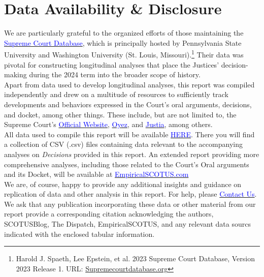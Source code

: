 \newpage

\section{Data Availability \& Disclosure}

\noindent We are particularly grateful to the organized efforts of those maintaining the \href{http://scdb.wustl.edu/}{\textcolor{blue}{Supreme Court Database}}, which is principally hosted by Pennsylvania State University and Washington University (St. Louis, Missouri).\footnote{Harold J. Spaeth, Lee Epstein, et al. 2023 Supreme Court Database, Version 2023 Release 1. URL: \href{http://Supremecourtdatabase.org}{Supremecourtdatabase.org}}  Their data was pivotal for constructing longitudinal analyses that place the Justices' decision-making during the 2024 term into the broader scope of history. \\

\noindent Apart from data used to develop longitudinal analyses, this report was compiled independently and drew on a multitude of resources to sufficiently track developments and behaviors expressed in the Court's oral arguments, decisions, and docket, among other things. These include, but are not limited to, the Supreme Court's \href{https://www.supremecourt.gov/}{\textcolor{blue}{Official Website}}, \href{https://www.oyez.org/}{\textcolor{blue}{Oyez}}, and \href{https://www.justia.com/}{\textcolor{blue}{Justia}}, among others. \\

\noindent All data used to compile this report will be available \href{https://github.com/JakeTruscott/scotuswatch}{\textcolor{blue}{HERE}}. There you will find a collection of CSV (.csv) files containing data relevant to the accompanying analyses on \emph{Decisions} provided in this report. An extended report providing more comprehensive analyses, including those related to the Court's Oral arguments and its Docket, will be available at \href{https://empiricalscotus.com/}{\textcolor{blue}{EmpiricalSCOTUS.com}}  \\

\noindent We are, of course, happy to provide any additional insights and guidance on replication of data and other analysis in this report. For help, please \href{mailto:adam@feldmannet.com}{\textcolor{blue}{Contact Us}}. \\

\noindent We ask that any publication incorporating these data or other material from our report provide a corresponding citation acknowledging the authors, SCOTUSBlog, The Dispatch, EmpiricalSCOTUS, and any relevant data sourcs indicated with the enclosed tabular information. \\



